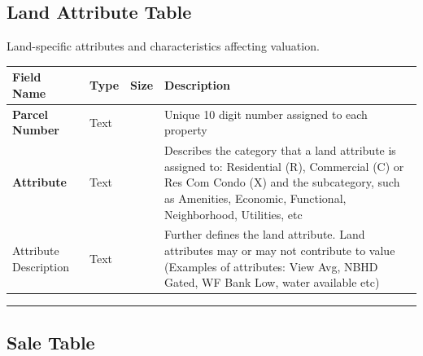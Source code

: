 \documentclass[
  english,
  letterpaper,
  DIV=11,
  numbers=noendperiod]{scrreprt}
\newcounter{none} %
\begin{document}
\subsection{Land Attribute Table}\label{land-attribute-table}

Land-specific attributes and characteristics affecting valuation.

{\def\LTcaptype{none} %
\begin{longtable}[]{@{}
  >{\raggedright\arraybackslash}p{}
  >{\raggedright\arraybackslash}p{}
  >{\raggedright\arraybackslash}p{}
  >{\raggedright\arraybackslash}p{}@{}}
\toprule\noalign{}
\begin{minipage}[b]{\linewidth}\raggedright
Field Name
\end{minipage} & \begin{minipage}[b]{\linewidth}\raggedright
Type
\end{minipage} & \begin{minipage}[b]{\linewidth}\raggedright
Size
\end{minipage} & \begin{minipage}[b]{\linewidth}\raggedright
Description
\end{minipage} \\
\midrule\noalign{}
\endhead
\bottomrule\noalign{}
\endlastfoot
\textbf{Parcel Number} & Text & 10 & Unique 10 digit number assigned to
each property \\
\textbf{Attribute} & Text & 30 & Describes the category that a land
attribute is assigned to: Residential (R), Commercial (C) or Res Com
Condo (X) and the subcategory, such as Amenities, Economic, Functional,
Neighborhood, Utilities, etc \\
Attribute Description & Text & 30 & Further defines the land attribute.
Land attributes may or may not contribute to value (Examples of
attributes: View Avg, NBHD Gated, WF Bank Low, water available etc) \\
\end{longtable}
}

\begin{center}\rule{0.5\linewidth}{0.5pt}\end{center}

\subsection{Sale Table}\label{sale-table}
\end{document}
